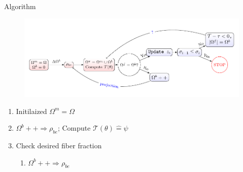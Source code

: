 \documentclass{beamer}
\newcommand{\circumeq}{\mathrel{\widehat{=}}}
\begin{document}
\begin{frame}{Algorithm}
    \begin{figure}[!ht]
        \centering
        \includegraphics[width=1\textwidth]{./Schematics/treenodes.pdf}
        \label{fig:treenode}
    \end{figure}
    \begin{enumerate}
        \item Initilaized $\Omega^{m}=\Omega$
        \item $\Omega^{b}++ \Rightarrow \rho_{be}$;
              Compute $\mathcal{T}(\theta)\circumeq \psi$
        \item Check desired fiber fraction
              \begin{enumerate}
                  \item $\Omega^{b}++ \Rightarrow \rho_{be}$
              \end{enumerate}
    \end{enumerate}
\end{frame}
\end{document}
